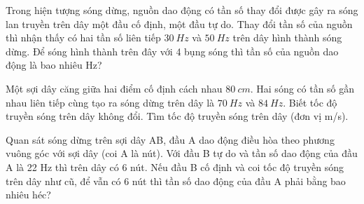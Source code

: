 














\setcounter{paragraph}{0}
\setcounter{ex}{0}
\PhanIII
\begin{ex}
Trong hiện tượng sóng dừng, nguồn dao động có tần số thay đổi được gây ra sóng lan truyền trên dây một đầu cố định, một đầu tự do. Thay đổi tần số của nguồn thì nhận thấy có hai tần số liên tiếp $30 ~Hz$ và $50 ~Hz$ trên dây hình thành sóng dừng. Để sóng hình thành trên đây với 4 bụng sóng thì tần số của nguồn dao động là bao nhiêu Hz?\\
\end{ex} 
\begin{ex}
Một sợi dây căng giữa hai điểm cố định cách nhau $80 ~cm$. Hai sóng có tần số gần nhau liên tiếp cùng tạo ra sóng dừng trên dây là $70 ~Hz$ và $84 ~Hz$. Biết tốc độ truyền sóng trên dây không đổi. Tìm tốc độ truyền sóng trên dây (đơn vị m/s).\\
\end{ex} 


\begin{ex}%
Quan sát sóng dừng trên sợi dây AB, đầu A dao động điều hòa theo phương vuông góc với sợi dây (coi A là nút). Với đầu B tự do và tần số dao động của đầu A là 22 Hz thì trên dây có 6 nút. Nếu đầu B cố định và coi tốc độ truyền sóng trên dây như cũ, để vẫn có 6 nút thì tần số dao động của đầu A phải bằng bao nhiêu héc?
\end{ex} 

